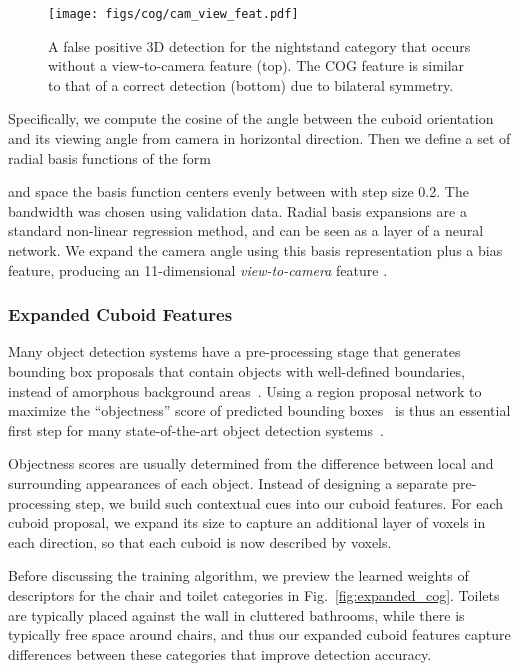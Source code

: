 \begin{figure}[!ht]
\centering
\texttt{[image: figs/cog/cam\_view\_feat.pdf]}
 \caption{A false positive 3D detection for the nightstand category that occurs without a view-to-camera feature  (top). 
          The COG feature is similar to that of a correct detection (bottom) due to bilateral symmetry.}
   \label{fig:exp_view}
\end{figure}

Specifically, we compute the cosine  of the angle between the cuboid orientation 
and its viewing angle from camera in horizontal direction. Then we define a set of radial basis functions of the form

and space the basis function centers  evenly between  with step size 0.2.  The bandwidth  was chosen using validation data.
Radial basis expansions are a standard non-linear regression method, 
and can be seen as a layer of a neural network. 
We expand the camera angle using this basis representation plus a bias feature, producing an 11-dimensional \emph{view-to-camera} feature .


\subsubsection{Expanded Cuboid Features}
Many object detection systems have a pre-processing stage that generates bounding box proposals that contain objects with well-defined boundaries, instead of amorphous background areas~\cite{alexe2012measuring}. Using a region proposal network to maximize the ``objectness'' score of predicted bounding boxes~\cite{kuo2015deepbox} is thus an essential first step for many state-of-the-art object detection systems~\cite{girshick2014rich,song2016deep}. 

Objectness scores are usually determined from the difference between local and surrounding appearances of each object. 
Instead of designing a separate pre-processing step, we build such contextual cues into our cuboid features. For each cuboid proposal, we expand its size to capture an additional layer of voxels in each direction, so that each cuboid is now described by  voxels. 

Before discussing the training algorithm, we preview the learned weights of \cog descriptors for the chair and toilet categories in Fig.~\ref{fig:expanded_cog}. Toilets are typically placed against the wall in cluttered bathrooms, while there is typically free space around chairs, and thus our expanded cuboid features capture differences between these categories that improve detection accuracy.

